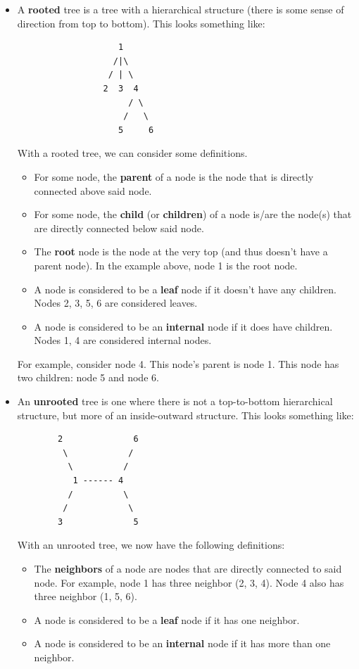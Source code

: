 \documentclass[letterpaper]{article}
\begin{document}
\begin{itemize}
    \item A \textbf{rooted} tree is a tree with a hierarchical structure (there is some sense of direction from top to bottom). This looks something like:  
    \begin{verbatim}
                    1
                   /|\
                  / | \
                 2  3  4 
                      / \
                     /   \ 
                    5     6
    \end{verbatim}
    With a rooted tree, we can consider some definitions. 
    \begin{itemize}
        \item For some node, the \textbf{parent} of a node is the node that is directly connected above said node. 
        \item For some node, the \textbf{child} (or \textbf{children}) of a node is/are the node(s) that are directly connected below said node.
        \item The \textbf{root} node is the node at the very top (and thus doesn't have a parent node). In the example above, node 1 is the root node.  
        \item A node is considered to be a \textbf{leaf} node if it doesn't have any children. Nodes 2, 3, 5, 6 are considered leaves.
        \item A node is considered to be an \textbf{internal} node if it does have children. Nodes 1, 4 are considered internal nodes.  
    \end{itemize}
    For example, consider node 4. This node's parent is node 1. This node has two children: node 5 and node 6. 


    \item An \textbf{unrooted} tree is one where there is not a top-to-bottom hierarchical structure, but more of an inside-outward structure. This looks something like: 
    \begin{verbatim}
        2              6
         \            /
          \          /
           1 ------ 4
          /          \ 
         /            \ 
        3              5
    \end{verbatim}
    With an unrooted tree, we now have the following definitions:
    \begin{itemize}
        \item The \textbf{neighbors} of a node are nodes that are directly connected to said node. For example, node 1 has three neighbor (2, 3, 4). Node 4 also has three neighbor (1, 5, 6).
        \item A node is considered to be a \textbf{leaf} node if it has one neighbor. 
        \item A node is considered to be an \textbf{internal} node if it has more than one neighbor. 
    \end{itemize}
\end{itemize}
\end{document}
